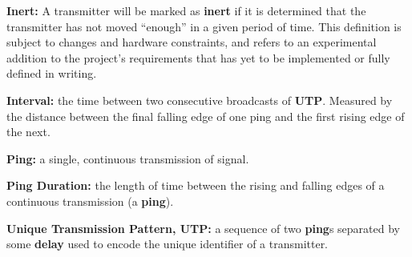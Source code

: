 \documentclass[12pt]{article}
\begin{document}
{\bf Inert:}
	A transmitter will be marked as {\bf inert} if it is determined that the
	transmitter has not moved ``enough'' in a given period of time.
	This definition is subject to changes and hardware constraints, and
	refers to an experimental addition to the project's requirements that
	has yet to be implemented or fully defined in writing.

{\bf Interval:}
	the time between two consecutive broadcasts of {\bf UTP}. Measured by the
	distance between the final falling edge of one ping and the first rising
	edge of the next.

{\bf Ping:}
	a single, continuous transmission of signal.

{\bf Ping Duration:}
	the length of time between the rising and falling edges of a continuous
	transmission (a {\bf ping}).

{\bf Unique Transmission Pattern, UTP:}
	a sequence of two {\bf ping}s separated by some {\bf delay} used to
	encode the unique identifier of a transmitter.
\end{document}

